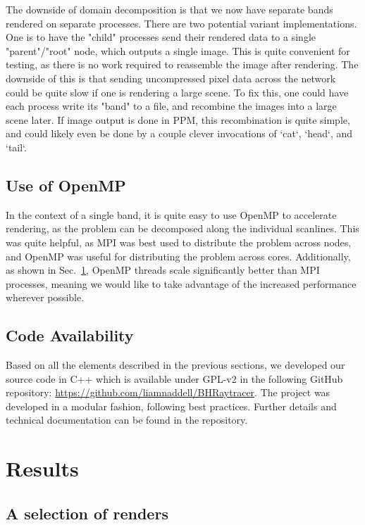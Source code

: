 The downside of domain decomposition is that we now have separate bands rendered on separate processes. There are two potential variant implementations. One is to have the "child" processes send their rendered data to a single "parent"/"root" node, which outputs a single image. This is quite convenient for testing, as there is no work required to reassemble the image after rendering. The downside of this is that sending uncompressed pixel data across the network could be quite slow if one is rendering a large scene. To fix this, one could have each process write its "band" to a file, and recombine the images into a large scene later. If image output is done in PPM, this recombination is quite simple, and could likely even be done by a couple clever invocations of `cat`, `head`, and `tail`.


\subsection{Use of OpenMP}
In the context of a single band, it is quite easy to use OpenMP \cite{660313_OMP} to accelerate rendering, as the problem can be decomposed along the individual scanlines. This was quite helpful, as MPI was best used to distribute the problem across nodes, and OpenMP was useful for distributing the problem across cores.
Additionally, as shown in Sec.~\ref{sec:results}, OpenMP threads scale significantly better than MPI processes, meaning we would like to take advantage of the increased performance wherever possible.


\subsection{Code Availability}
Based on all the elements described in the previous sections,
we developed our source code in C++ which is available under GPL-v2 in the following
GitHub repository: \url{https://github.com/liamnaddell/BHRaytracer}. The project was developed in a modular fashion, following best practices. Further details and technical documentation can be found in the repository.




\section{Results}
\label{sec:results}

\subsection{A selection of renders}

